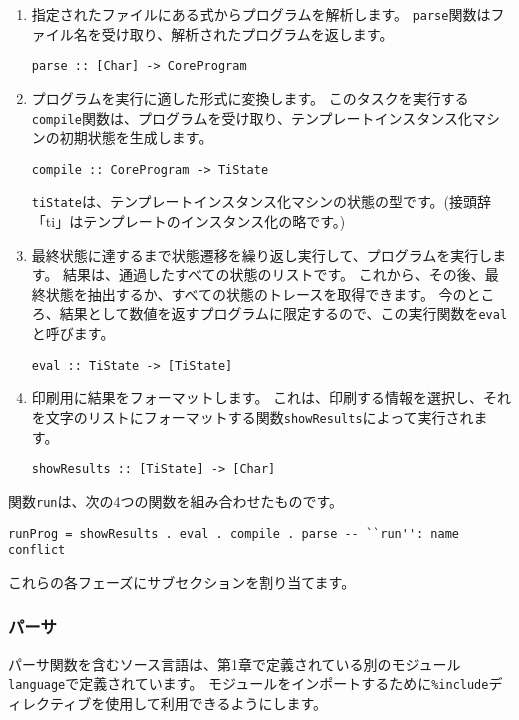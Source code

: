 \documentclass{jarticle}
\begin{document}
\begin{enumerate}
	\item 指定されたファイルにある式からプログラムを解析します。
	      \texttt{parse}関数はファイル名を受け取り、解析されたプログラムを返します。
	      \begin{verbatim}
parse :: [Char] -> CoreProgram
\end{verbatim}
	\item プログラムを実行に適した形式に変換します。
	      このタスクを実行する\texttt{compile}関数は、プログラムを受け取り、テンプレートインスタンス化マシンの初期状態を生成します。
	      \begin{verbatim}
compile :: CoreProgram -> TiState
\end{verbatim}
	      \texttt{tiState}は、テンプレートインスタンス化マシンの状態の型です。(接頭辞「ti」はテンプレートのインスタンス化の略です。)
	\item 最終状態に達するまで状態遷移を繰り返し実行して、プログラムを実行します。
	      結果は、通過したすべての状態のリストです。
	      これから、その後、最終状態を抽出するか、すべての状態のトレースを取得できます。
	      今のところ、結果として数値を返すプログラムに限定するので、この実行関数を\texttt{eval}と呼びます。
	      \begin{verbatim}
eval :: TiState -> [TiState]
\end{verbatim}
	\item 印刷用に結果をフォーマットします。
	      これは、印刷する情報を選択し、それを文字のリストにフォーマットする関数\texttt{showResults}によって実行されます。
	      \begin{verbatim}
showResults :: [TiState] -> [Char]
\end{verbatim}
\end{enumerate}

関数\texttt{run}は、次の4つの関数を組み合わせたものです。

\begin{verbatim}
runProg = showResults . eval . compile . parse -- ``run'': name conflict
\end{verbatim}

これらの各フェーズにサブセクションを割り当てます。

\subsubsection{パーサ}

パーサ関数を含むソース言語は、第1章で定義されている別のモジュール\texttt{language}で定義されています。
モジュールをインポートするために\texttt{\%include}ディレクティブを使用して利用できるようにします。
\end{document}
